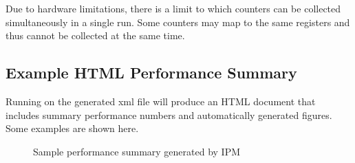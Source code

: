 \documentclass[letterpaper,10pt,english]{sphinxmanual}
\begin{document}
\sphinxAtStartPar
Due to hardware limitations, there is a limit to which counters can be
collected simultaneously in a single run. Some counters may map to the same
registers and thus cannot be collected at the same time.


\subsection{Example HTML Performance Summary}
\label{\detokenize{External_Profiling_Tools:example-html-performance-summary}}
\sphinxAtStartPar
Running  on the generated xml file will produce an
HTML document that includes summary performance numbers and automatically
generated figures. Some examples are shown here.

\begin{figure}[htbp]
\centering
\capstart

\noindent{}
\caption{Sample performance summary generated by IPM}\label{\detokenize{External_Profiling_Tools:id11}}\end{figure}

\begin{figure}[htbp]
\centering

\noindent{}
\end{figure}
\end{document}
